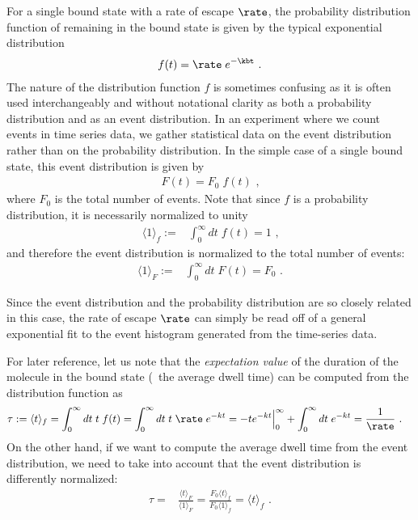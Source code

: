 For a single bound state with a rate of escape $\rate$, the probability distribution function of remaining in
the bound state is given by the typical exponential distribution
%
\begin{align*}
    f(t) = \rate \; e^{-\kbt}
    \text{ .}
\end{align*}
%
The nature of the distribution function $f$ is sometimes confusing as it is often used interchangeably and
without notational clarity as both a probability distribution and as an event distribution. In an experiment
where we count events in time series data, we gather statistical data on the event distribution rather than on
the probability distribution. In the simple case of a single bound state, this event distribution is given by
%
\begin{align}\label{eq:event_distri}
    F(t) = F_0 \;f(t)
    \text{ ,}
\end{align}
%
where $F_0$ is the total number of events. Note that since $f$ is a probability distribution, it is
necessarily normalized to unity
%
\begin{align}
    \langle 1\rangle_f :={}& \int_0^\infty dt\;f(t) = 1
    \text{ ,}
\end{align}
%
and therefore the event distribution is normalized to the total number of events:
%
\begin{align}\label{eq:normalization}
    \langle 1\rangle_F :={}& \int_0^\infty dt\;F(t) = F_0
    \text{ .}
\end{align}
%

Since the event distribution and the probability distribution are so closely related in this case, the rate of
escape $\rate$ can simply be read off of a general exponential fit to the event histogram generated from the
time-series data.

For later reference, let us note that the \emph{expectation value} of the duration of the molecule in the
bound state (\ie~the average dwell time) can be computed from the distribution function as
%
\begin{align*}
    \tau :={}& \langle t\rangle_f
    = \int_0^\infty dt\; t\; f(t)
    = \int_0^\infty dt\; t\;\rate\; e^{-kt}
    = - t e^{-kt}\Big|_{0}^\infty + \int_0^\infty dt \;e^{-kt}
    = \frac{1}{\rate}
    \text{ .}
\end{align*}
%
On the other hand, if we want to compute the average dwell time from the event distribution, we need to take
into account that the event distribution is differently normalized:
%
\begin{align}\label{eq:event_distri_norm}
    \tau ={}& \frac{\langle t\rangle_F}{\langle 1\rangle_F}
    = \frac{F_0\langle t\rangle_f}{F_0\langle 1\rangle_f}
    = \langle t\rangle_f
    \text{ .}
\end{align}
%


